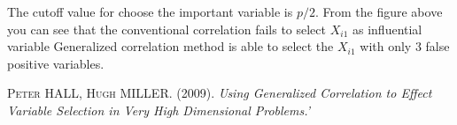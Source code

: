 \documentclass[paper=a4, fontsize=12pt]{scrartcl}
\numberwithin{equation}{section}
\numberwithin{figure}{section}
\numberwithin{table}{section}
\begin{document}
The cutoff value for choose the important variable is $p/2$. From the figure above you can see that the conventional correlation fails to select $X_{i1}$ as influential variable Generalized correlation method is able to select the $X_{i1}$ with only 3 false positive variables.


\begin{thebibliography}{9}

\textsc{Peter HALL, Hugh MILLER.} (2009). \textit{Using Generalized Correlation to Effect Variable Selection in Very High Dimensional Problems.'}

\end{thebibliography}
\end{document}
